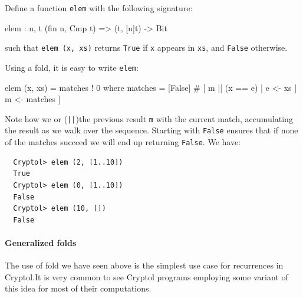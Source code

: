 \begin{Exercise}\label{ex:recfun:4:1}
Define a function {\tt elem} with the following signature:\indElem
\begin{code}
  elem : {n, t} (fin n, Cmp t) => (t, [n]t) -> Bit
\end{code}
such that {\tt elem (x, xs)} returns {\tt True} if {\tt x} appears in
{\tt xs}, and {\tt False} otherwise.
\end{Exercise}
\begin{Answer}
Using a fold, it is easy to write {\tt elem}:
\begin{code}
  elem (x, xs) = matches ! 0
      where matches = [False] # [ m || (x == e) | e <- xs
                                                | m <- matches
                                ]
\end{code}
Note how we or ({\tt ||})\indOr the previous result {\tt m} with the
current match, accumulating the result as we walk over the
sequence. Starting with {\tt False} ensures that if none of the
matches succeed we will end up returning {\tt False}.  We have:
\begin{Verbatim}
  Cryptol> elem (2, [1..10])
  True
  Cryptol> elem (0, [1..10])
  False
  Cryptol> elem (10, [])
  False
\end{Verbatim}
\end{Answer}

\paragraph*{Generalized folds} The use of fold we have seen above is
the simplest use case for recurrences in Cryptol.\indFold\indComp It
is very common to see Cryptol programs employing some variant of this
idea for most of their computations.


